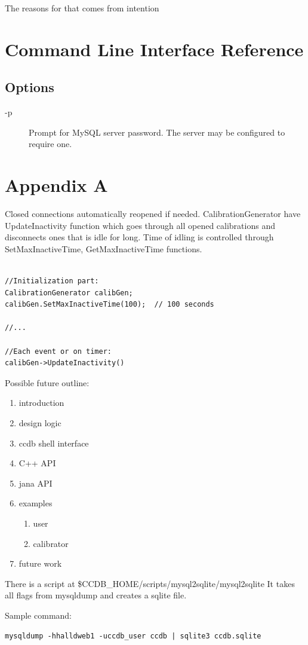 \documentclass{article}
\begin{document}
The reasons for that comes from intention

\section{Command Line Interface Reference}

\subsection{Options}

\begin{description}
\item[-p] Prompt for MySQL server password. The server may be configured to require one. 
\end{description}



\section{Appendix A}

Closed connections automatically reopened if needed. 
CalibrationGenerator have UpdateInactivity function which goes through all opened
 calibrations and disconnects ones that is idle for long. Time of idling is controlled 
 through SetMaxInactiveTime, GetMaxInactiveTime functions.


\begin{verbatim}

//Initialization part:
CalibrationGenerator calibGen;
calibGen.SetMaxInactiveTime(100);  // 100 seconds

//...

//Each event or on timer:
calibGen->UpdateInactivity()
\end{verbatim}

Possible future outline:

\begin{enumerate}
\item introduction
\item design logic
\item ccdb shell interface
\item C++ API
\item jana API
\item examples
  \begin{enumerate}
  \item user
  \item calibrator
  \end{enumerate}
\item future work
\end{enumerate}

There is a script at \$CCDB\_HOME/scripts/mysql2sqlite/mysql2sqlite
It takes all flags from mysqldump and creates a sqlite file.

Sample command:

\begin{verbatim}
mysqldump -hhalldweb1 -uccdb_user ccdb | sqlite3 ccdb.sqlite
\end{verbatim}
\end{document}
